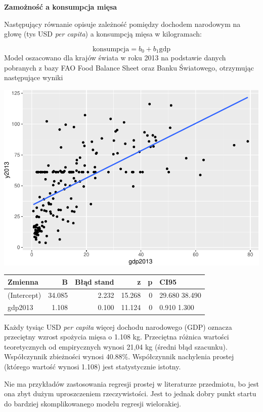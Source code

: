\documentclass[
  openany]{book}
\begin{document}
\begin{example}
\textbf{Zamożność a konsumpcja mięsa}

Następujący równanie opisuje zależność pomiędzy dochodem narodowym na głowę (tys USD \emph{per capita})
a konsumpcją mięsa w kilogramach:

\[\textrm{konsumpcja} = b_0 + b_1 \textrm{gdp}\]
Model oszacowano dla krajów świata w roku 2013 na podstawie danych
pobranych z bazy FAO Food Balance Sheet oraz Banku Światowego, otrzymując
następujące wyniki

\includegraphics{_main_files/figure-latex/unnamed-chunk-63-1.pdf}

\begin{tabular}{l|r|r|r|r|l}
\hline
Zmienna & B & Błąd stand & z & p & CI95\\
\hline
(Intercept) & 34.085 & 2.232 & 15.268 & 0 & 29.680 38.490\\
\hline
gdp2013 & 1.108 & 0.100 & 11.124 & 0 & 0.910 1.300\\
\hline
\end{tabular}

Każdy tysiąc USD \emph{per capita} więcej dochodu narodowego (GDP) oznacza przeciętny
wzrost spożycia mięsa o 1.108 kg. Przeciętna różnica wartości teoretycznych
od empirycznych wynosi 21,04 kg (średni błąd szacunku).
Współczynnik zbieżności wynosi 40.88\%.
Współczynnik nachylenia prostej (którego wartość
wynosi 1.108) jest statystycznie istotny.
\end{example}

Nie ma przykładów zastosowania regresji prostej w literaturze przedmiotu,
bo jest ona zbyt dużym uproszczeniem rzeczywistości. Jest to jednak
dobry punkt startu do bardziej skomplikowanego modelu regresji wielorakiej.
\end{document}
